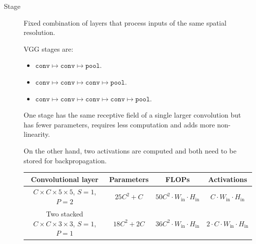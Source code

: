 \begin{description}
    \item[Stage] 
        Fixed combination of layers that process inputs of the same spatial resolution.

        VGG stages are:
        \begin{itemize}
            \item $\texttt{conv} \mapsto \texttt{conv} \mapsto \texttt{pool}$.
            \item $\texttt{conv} \mapsto \texttt{conv} \mapsto \texttt{conv} \mapsto \texttt{pool}$.
            \item $\texttt{conv} \mapsto \texttt{conv} \mapsto \texttt{conv} \mapsto \texttt{conv} \mapsto \texttt{pool}$.
        \end{itemize}

        \begin{remark}
            One stage has the same receptive field of a single larger convolution but 
            has fewer parameters, requires less computation and adds more non-linearity.

            On the other hand, two activations are computed and both need to be stored for backpropagation.

            \indenttbox
            \begin{example}
                \phantom{}
                \begin{center}
                    \footnotesize
                    \begin{tabular}{cccc}
                        \toprule
                        \textbf{Convolutional layer} & \textbf{Parameters} & \textbf{FLOPs} & \textbf{Activations} \\
                        \midrule
                        $C \times C \times 5 \times 5$, $S=1$, $P=2$ & $25C^2 + C$ & $50C^2 \cdot W_\text{in} \cdot H_\text{in}$ & $C \cdot W_\text{in} \cdot H_\text{in}$ \\
                        Two stacked $C \times C \times 3 \times 3$, $S=1$, $P=1$ & $18C^2 + 2C$ & $36C^2 \cdot W_\text{in} \cdot H_\text{in}$ & $2 \cdot C \cdot W_\text{in} \cdot H_\text{in}$ \\
                        \bottomrule
                    \end{tabular}
                \end{center}
            \end{example}
        \end{remark}
\end{description}

